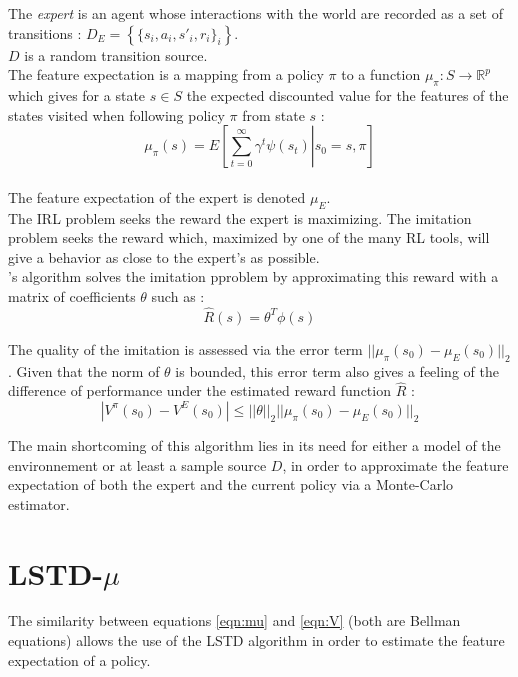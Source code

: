 \documentclass{article}
\begin{document}
The \emph{expert} is an agent whose interactions with the world are recorded as a set of transitions : $D_E = \left\{\{s_i,a_i,s'_i,r_i\}_i\right\}$.\\

$D$ is a random transition source.\\

The feature expectation is a mapping from a policy $\pi$ to a function $\mu_\pi : S \rightarrow \mathbb{R}^p$ which gives for a state $s\in S$ the expected discounted value for the features of the states visited when following policy $\pi$ from state $s$ :
\begin{equation}
\mu_\pi(s) = E\left[\left.\sum\limits_{t=0}^{\infty}\gamma^t\psi(s_t)\right|s_0=s,\pi\right]
\label{eqn:mu}
\end{equation}\\
The feature expectation of the expert is denoted $\mu_E$.\\

The IRL problem seeks the reward the expert is maximizing. The imitation problem seeks the reward which, maximized by one of the many RL tools, will give a behavior as close to the expert's as possible.\\

\citet{abbeel2004apprenticeship}'s algorithm solves the imitation pproblem by approximating this reward with a matrix of coefficients $\theta$ such as :
\begin{equation}
\hat R(s) = \theta^T\phi(s)
\end{equation}

The quality of the imitation is assessed via the error term $||\mu_\pi(s_0)-\mu_E(s_0)||_2$. Given that the norm of $\theta$ is bounded, this error term also gives a feeling of the difference of performance under the estimated reward function $\hat R$ :
\begin{equation}
|V^\pi(s_0)-V^E(s_0)| \leq ||\theta||_2||\mu_\pi(s_0)-\mu_E(s_0)||_2
\label{eqn:vmu}
\end{equation}

The main shortcoming of this algorithm lies in its need for either a model of the environnement or at least a sample source $D$, in order to approximate the feature expectation of both the expert and the current policy via a Monte-Carlo estimator.
\section{LSTD-$\mu$}
The similarity between equations \ref{eqn:mu} and \ref{eqn:V} (both are Bellman equations) allows the use of the LSTD algorithm in order to estimate the feature expectation of a policy.\\
\end{document}
